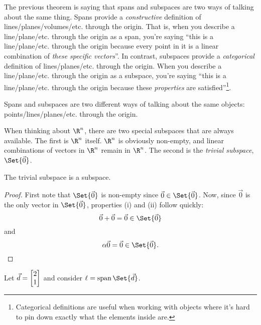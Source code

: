 The previous theorem is saying that spans and subspaces are two ways of talking about the same
thing. Spans provide a \emph{constructive} definition of lines/planes/volumes/etc. through the origin. That is,
when you describe a line/plane/etc. through the origin as a span, you're saying ``this is a line/plane/etc. through the origin
because every point in it is a linear combination of \emph{these specific vectors}''. In contrast, subspaces provide a \emph{categorical}
definition of lines/planes/etc. through the origin. 
When you describe a line/plane/etc. through the origin as a subspace, 
you're saying ``this is a line/plane/etc. through the origin because these \emph{properties} are satisfied''\footnote{
Categorical definitions are useful when working with objects where it's hard to pin down exactly what the elements
inside are.}.


\begin{emphbox}[Takeaway]
	Spans and subspaces are two different ways of talking about the same objects: points/lines/planes/etc. through the origin.
\end{emphbox}

When thinking about $\R^n$, there are two special subspaces that are always available. The first is $\R^n$ itself.
$\R^n$ is obviously non-empty, and linear combinations of vectors in $\R^n$ remain in $\R^n$. The second is
the \emph{trivial subspace}, $\Set{\vec 0}$.


\begin{theorem}
	The trivial subspace is a subspace.
\end{theorem}
\begin{proof}
	First note that $\Set{\vec 0}$ is non-empty since $\vec 0\in\Set{\vec 0}$. Now, since
	$\vec 0$ is the only vector in $\Set{\vec 0}$, properties (i) and (ii) follow quickly:
	\[
		\vec 0+\vec 0=\vec 0\in \Set{\vec 0}
	\]
	and
	\[
		\alpha\vec 0=\vec 0\in\Set{\vec 0}.
	\]
\end{proof}


Let $\vec d=\mat{2\\1}$ and consider $\ell=\Span\Set{\vec d}$.


